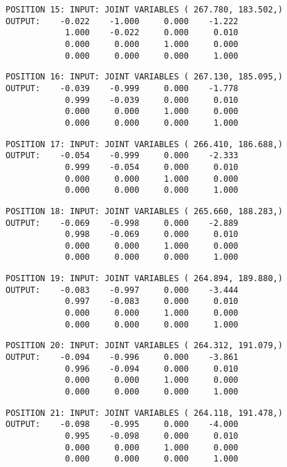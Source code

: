 \begin{verbatim}
\end{verbatim} \pagebreak[1]\begin{verbatim}
POSITION 15: INPUT: JOINT VARIABLES ( 267.780, 183.502,)
OUTPUT:    -0.022    -1.000     0.000    -1.222
            1.000    -0.022     0.000     0.010
            0.000     0.000     1.000     0.000
            0.000     0.000     0.000     1.000
\end{verbatim} \pagebreak[1]\begin{verbatim}
POSITION 16: INPUT: JOINT VARIABLES ( 267.130, 185.095,)
OUTPUT:    -0.039    -0.999     0.000    -1.778
            0.999    -0.039     0.000     0.010
            0.000     0.000     1.000     0.000
            0.000     0.000     0.000     1.000
\end{verbatim} \pagebreak[1]\begin{verbatim}
POSITION 17: INPUT: JOINT VARIABLES ( 266.410, 186.688,)
OUTPUT:    -0.054    -0.999     0.000    -2.333
            0.999    -0.054     0.000     0.010
            0.000     0.000     1.000     0.000
            0.000     0.000     0.000     1.000
\end{verbatim} \pagebreak[1]\begin{verbatim}
POSITION 18: INPUT: JOINT VARIABLES ( 265.660, 188.283,)
OUTPUT:    -0.069    -0.998     0.000    -2.889
            0.998    -0.069     0.000     0.010
            0.000     0.000     1.000     0.000
            0.000     0.000     0.000     1.000
\end{verbatim} \pagebreak[1]\begin{verbatim}
POSITION 19: INPUT: JOINT VARIABLES ( 264.894, 189.880,)
OUTPUT:    -0.083    -0.997     0.000    -3.444
            0.997    -0.083     0.000     0.010
            0.000     0.000     1.000     0.000
            0.000     0.000     0.000     1.000
\end{verbatim} \pagebreak[1]\begin{verbatim}
POSITION 20: INPUT: JOINT VARIABLES ( 264.312, 191.079,)
OUTPUT:    -0.094    -0.996     0.000    -3.861
            0.996    -0.094     0.000     0.010
            0.000     0.000     1.000     0.000
            0.000     0.000     0.000     1.000
\end{verbatim} \pagebreak[1]\begin{verbatim}
POSITION 21: INPUT: JOINT VARIABLES ( 264.118, 191.478,)
OUTPUT:    -0.098    -0.995     0.000    -4.000
            0.995    -0.098     0.000     0.010
            0.000     0.000     1.000     0.000
            0.000     0.000     0.000     1.000
\end{verbatim} \pagebreak[1]